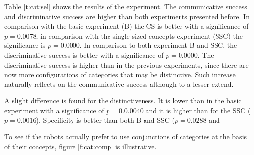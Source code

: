 Table \ref{t:cat:sel} shows the results of the experiment. The communicative success and discriminative success are higher than both experiments presented before. In comparison with the basic experiment (B) the CS is better with a significance of $p=0.0078$, in comparison with the single sized concepts experiment (SSC) the significance is $p=0.0000$. In comparison to both experiment B and SSC, the discriminative success is better with a significance of $p=0.0000$. The discriminative success is higher than in the previous experiments, since there are now more configurations of categories that may be distinctive. Such increase naturally reflects on the communicative success although to a lesser extend.

A slight difference is found for the distinctiveness. It is lower than in the basic experiment with a significance of $p=0.0.0040$ and it is higher than for the SSC ($p=0.0016$). Specificity is better than both B and SSC ($p=0.0288$ and %

To see if the robots actually prefer to use conjunctions of categories at the basis of their concepts, figure \ref{f:cat:comp} is illustrative.


